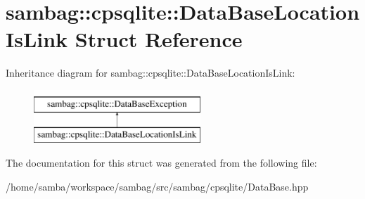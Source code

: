 \hypertarget{structsambag_1_1cpsqlite_1_1_data_base_location_is_link}{
\section{sambag::cpsqlite::DataBaseLocationIsLink Struct Reference}
\label{structsambag_1_1cpsqlite_1_1_data_base_location_is_link}
}
Inheritance diagram for sambag::cpsqlite::DataBaseLocationIsLink:\begin{figure}[H]
\begin{center}
\leavevmode
\includegraphics[height=2.000000cm]{structsambag_1_1cpsqlite_1_1_data_base_location_is_link}
\end{center}
\end{figure}


The documentation for this struct was generated from the following file:\begin{DoxyCompactItemize}
\item 
/home/samba/workspace/sambag/src/sambag/cpsqlite/DataBase.hpp\end{DoxyCompactItemize}
